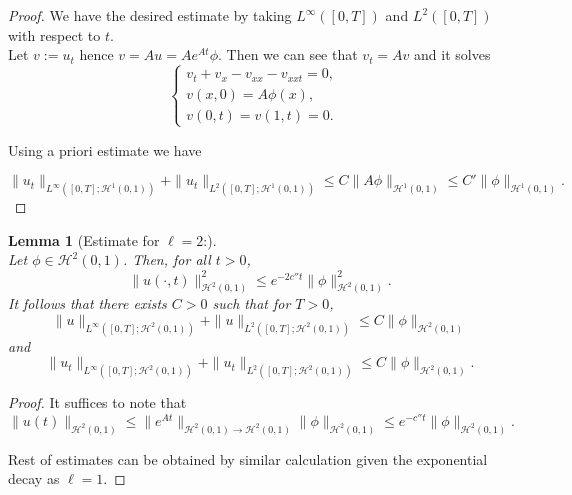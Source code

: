 \documentclass[10pt,a4paper,final]{article}
\numberwithin{equation}{section}
\newtheorem{lemma}[theorem]{Lemma}
\newcommand{\cH}{\mathcal{H}}
\begin{document}
\begin{proof}
We have the desired estimate by taking $L^{\infty}([0,T])$ and $L^2([0,T])$ with respect to $t$.\\

Let $v:=u_t$ hence $v=Au =Ae^{At}\phi$.  Then we can see that $v_t=Av$ and it solves
\begin{equation*}
\begin{cases}
    v_t+v_x-v_{xx}-v_{xxt}=0, &\\
    v(x,0)= A\phi(x),&\\ 
    v(0,t)=v(1,t)=0.&
\end{cases}
\end{equation*}

Using a priori estimate we have 

$$\|u_t\|_{L^{\infty}([0,T];\cH^{1}(0,1))} + \|u_t\|_{L^2([0,T];\cH^{1}(0,1))}\leq C\|A\phi\|_{\cH^1(0,1)}\leq C'\|\phi \|_{\cH^1(0,1)}.$$
\end{proof}

\begin{lemma}[Estimate for $\ell=2$:]\label{aprih2}\ \\
    Let $\phi \in \cH^2(0,1)$. Then, for all $t>0$, 
    $$\|u(\cdot,t)\|_{\cH^2(0,1)}^2\leq e^{-2c''t}\|\phi\|_{\cH^2(0,1)}^2. $$
     It follows that there exists $C>0$ such that for $T> 0$, 
    $$\|u\|_{L^{\infty}([0,T];\cH^{2}(0,1))} + \|u\|_{L^2([0,T];\cH^{2}(0,1))}\leq C\|\phi\|_{\cH^2(0,1)}$$
and 
$$\|u_t\|_{L^{\infty}([0,T];\cH^{2}(0,1))} + \|u_t\|_{L^2([0,T];\cH^{2}(0,1))}\leq C\|\phi \|_{\cH^2(0,1)}.$$
\end{lemma}
\begin{proof}
   It suffices to note that 
    $$\|u(t)\|_{\cH^{2}(0,1)}\leq \|e^{At}\|_{\cH^2(0,1)\to \cH^2(0,1)}\|\phi\|_{\cH^2(0,1)}\leq e^{-c''t}\|\phi\|_{\cH^2(0,1)}.$$

Rest of estimates can be obtained by similar calculation given the exponential decay as $\ell=1$.
\end{proof}
\end{document}
